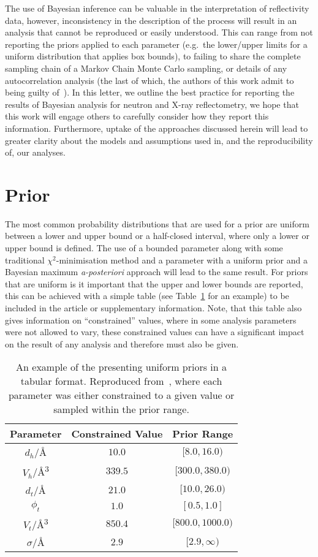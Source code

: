 \documentclass[reprint,superscriptaddress,aps,amsmath]{revtex4-2}
\begin{document}
The use of Bayesian inference can be valuable in the interpretation of reflectivity data, however, inconsistency in the description of the process will result in an analysis that cannot be reproduced or easily understood. 
This can range from not reporting the priors applied to each parameter (e.g.\ the lower/upper limits for a uniform distribution that applies box bounds), to failing to share the complete sampling chain of a Markov Chain Monte Carlo sampling, or details of any autocorrelation analysis (the last of which, the authors of this work admit to being guilty of~\cite{mccluskey_bayesian_2019}). 
In this letter, we outline the best practice for reporting the results of Bayesian analysis for neutron and X-ray reflectometry, we hope that this work will engage others to carefully consider how they report this information. 
Furthermore, uptake of the approaches discussed herein will lead to greater clarity about the models and assumptions used in, and the reproducibility of, our analyses.

\section{Prior}\label{sec:prior}

The most common probability distributions that are used for a prior are uniform between a lower and upper bound or a half-closed interval, where only a lower or upper bound is defined.
The use of a bounded parameter along with some traditional $\chi^2$-minimisation method and a parameter with a uniform prior and a Bayesian maximum \emph{a-posteriori} approach will lead to the same result. 
For priors that are uniform is it important that the upper and lower bounds are reported, this can be achieved with a simple table  (see Table~\ref{tab:bounds} for an example) to be included in the article or supplementary information. 
Note, that this table also gives information on ``constrained'' values, where in some analysis parameters were not allowed to vary, these constrained values can have a significant impact on the result of any analysis and therefore must also be given.
%
\begin{table}
    \caption{An example of the presenting uniform priors in a tabular format. Reproduced from~\cite{mccluskey_general_2020}, where each parameter was either constrained to a given value or sampled within the prior range.}\label{tab:bounds}
    \begin{tabular}{c | c | c}
        Parameter & Constrained Value & Prior Range \\ 
        \hline
        $d_h$/\si{\angstrom} & $10.0$ & $[8.0, 16.0)$\\
        $V_h$/\si{\angstrom^3} & $339.5$ & $[300.0, 380.0)$\\
        $d_t$/\si{\angstrom} & $21.0$ & $[10.0, 26.0)$\\
        $\phi_t$ & $1.0$ & $[0.5, 1.0]$\\
        $V_t$/\si{\angstrom^3} & $850.4$ & $[800.0, 1000.0)$\\
        $\sigma$/\si{\angstrom} & $2.9$ & $[2.9, \infty)$\\
    \end{tabular}
\end{table}
%
\end{document}
